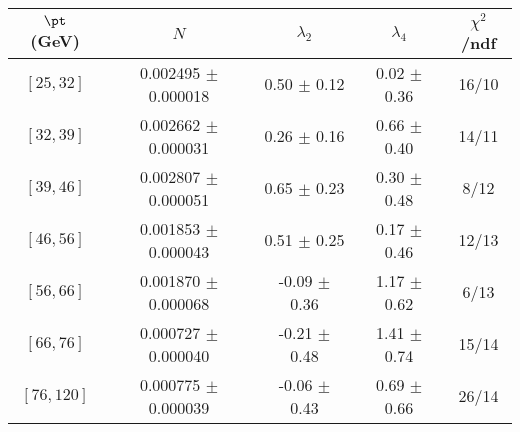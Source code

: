 \begin{tabular}{c||c|c|c|c}
$\pt$ (GeV) & $N$ & $\lambda_{2}$ & $\lambda_4$  & $\chi^2$/ndf  \\
\hline
$[25, 32]$ & 0.002495 $\pm$ 0.000018 & 0.50 $\pm$ 0.12 & 0.02 $\pm$ 0.36 & 16/10\\
$[32, 39]$ & 0.002662 $\pm$ 0.000031 & 0.26 $\pm$ 0.16 & 0.66 $\pm$ 0.40 & 14/11\\
$[39, 46]$ & 0.002807 $\pm$ 0.000051 & 0.65 $\pm$ 0.23 & 0.30 $\pm$ 0.48 & 8/12\\
$[46, 56]$ & 0.001853 $\pm$ 0.000043 & 0.51 $\pm$ 0.25 & 0.17 $\pm$ 0.46 & 12/13\\
$[56, 66]$ & 0.001870 $\pm$ 0.000068 & -0.09 $\pm$ 0.36 & 1.17 $\pm$ 0.62 & 6/13\\
$[66, 76]$ & 0.000727 $\pm$ 0.000040 & -0.21 $\pm$ 0.48 & 1.41 $\pm$ 0.74 & 15/14\\
$[76, 120]$ & 0.000775 $\pm$ 0.000039 & -0.06 $\pm$ 0.43 & 0.69 $\pm$ 0.66 & 26/14\\
\end{tabular}
